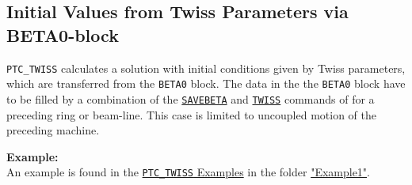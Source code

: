 \subsection{Initial Values from Twiss Parameters via BETA0-block}
\label{subsec:from-beta0-block}

\texttt{PTC\_TWISS} calculates a solution with initial conditions given by
Twiss parameters, which are transferred from the \texttt{BETA0} block.  The
data in the the \texttt{BETA0} block have to be filled by a combination of
the \hyperref[sec:savebeta]{\texttt{SAVEBETA}} and
\hyperref[chap:twiss]{\texttt{TWISS}} commands of \madx for a preceding
ring or beam-line. This case is limited to uncoupled motion of the
preceding machine. 

      
\textbf{Example:} \\
An example is found in the
\href{http://madx.web.cern.ch/madx/madX/examples/ptc_twiss/}
{\texttt{PTC\_TWISS} Examples} in the folder
\href{http://madx.web.cern.ch/madx/madX/examples/ptc_twiss/Example1}
{"Example1"}. 



